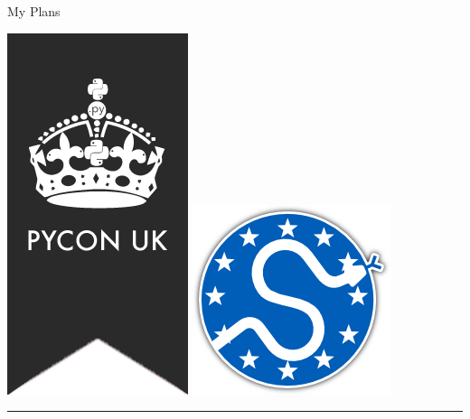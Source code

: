 \documentclass{beamer}
\begin{document}
\begin{frame}{My Plans}
    \begin{center}

        \includegraphics[height=0.25\textheight]{static/pyconuk.png}
        \hspace{3cm}
        \includegraphics[height=0.2\textheight]{static/euroscipy.png}
        
        \rule{\textwidth}{2pt}
        \vspace{5pt}


\end{center}
\end{frame}
\end{document}
